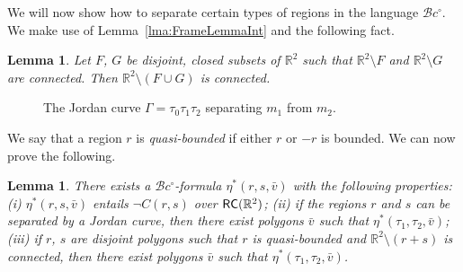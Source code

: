 \documentclass{article}
\newtheorem{lemma}[theorem]{Lemma}
\newcommand{\cBci}{\ensuremath{\mathcal{B}c^\circ}}
\newcommand{\R}{\mathbb{R}}
\newcommand{\RC}{{\sf RC}}
\begin{document}
We will now show how to separate certain types of regions in the language $\cBci$. 
We make use of Lemma~\ref{lma:FrameLemmaInt} and the following fact.
\begin{lemma}\label{lma:Newman}{\cite[p.~137]{ijcai:Newman64}}
	Let $F$, $G$ be disjoint, closed subsets of $\R^2$ such that
	$\R^2\setminus F$ and $\R^2 \setminus G$ are connected. Then
	$\R^2\setminus (F \cup G)$ is connected.
\end{lemma}
\begin{figure}[h]
	\begin{center}
	\end{center}
	\caption{The Jordan curve $\Gamma=\tau_0\tau_1\tau_2$ separating $m_1$ from $m_2$.}
	\label{fig:SepBci}
\end{figure}
We say that a region $r$ is \emph{quasi-bounded} if either $r$ or $-r$ is bounded.
We can now prove the following.
\begin{lemma}\label{lma:Cci2BciStar}
	There exists a $\cBci$-formula $\eta^*(r,s, \bar{v})$ with the
	following properties: \textup{(}i\textup{)} $\eta^*(r,s, \bar{v})$
	entails $\neg C(r,s)$ over $\RC(\R^2)$; \textup{(}ii\textup{)}
	if the regions $r$ and $s$ can be separated by a Jordan curve, 
	then there exist polygons $\bar{v}$ such that 
	$\eta^*(\tau_1,\tau_2, \bar{v})$; \textup{(}iii\textup{)} if $r$,
	$s$ are disjoint polygons such that $r$ is quasi-bounded and
	$\R^2 \setminus (r+s)$ is connected, then there exist polygons
	$\bar{v}$ such that $\eta^*(\tau_1,\tau_2, \bar{v})$.
\end{lemma}
\end{document}
